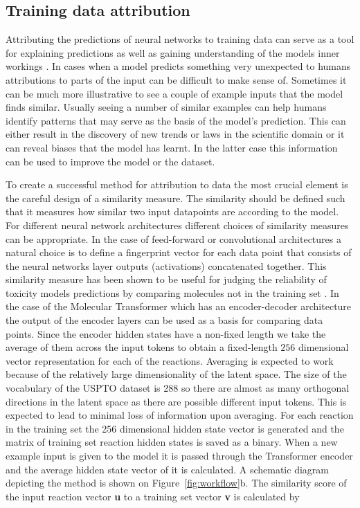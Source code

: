 \subsection{Training data attribution} \label{subsec:data_attribution}
Attributing the predictions of neural networks to training data can serve as a tool for explaining predictions as well as gaining understanding of the models inner workings \cite{tetko2002}. In cases when a model predicts something very unexpected to humans attributions to parts of the input can be difficult to make sense of. Sometimes it can be much more illustrative to see a couple of example inputs that the model finds similar. Usually seeing a number of similar examples can help humans identify patterns that may serve as the basis of the model's prediction. This can either result in the discovery of new trends or laws in the scientific domain or it can reveal biases that the model has learnt. In the latter case this information can be used to improve the model or the dataset.

To create a successful method for attribution to data the most crucial element is the careful design of a similarity measure. The similarity should be defined such that it measures how similar two input datapoints are according to the model. For different neural network architectures different choices of similarity measures can be appropriate. In the case of feed-forward or convolutional architectures a natural choice is to define a fingerprint vector for each data point that consists of the neural networks layer outputs (activations) concatenated together. This similarity measure has been shown to be useful for judging the reliability of toxicity models predictions by comparing molecules not in the training set \cite{Allen2020}. In the case of the Molecular Transformer which has an encoder-decoder architecture the output of the encoder layers can be used as a basis for comparing data points. Since the encoder hidden states have a non-fixed length we take the average of them across the input tokens to obtain a fixed-length $256$ dimensional vector representation for each of the reactions. Averaging is expected to work because of the relatively large dimensionality of the latent space. The size of the vocabulary of the USPTO dataset is 288 so there are almost as many orthogonal directions in the latent space as there are possible different input tokens. This is expected to lead to minimal loss of information upon averaging. For each reaction in the training set the 256 dimensional hidden state vector is generated and the matrix of training set reaction hidden states is saved as a binary. When a new example input is given to the model it is passed through the Transformer encoder and the average hidden state vector of it is calculated. A schematic diagram depicting the method is shown on Figure~\ref{fig:workflow}b. The similarity score of the input reaction vector \textbf{u} to a training set vector \textbf{v} is calculated by

